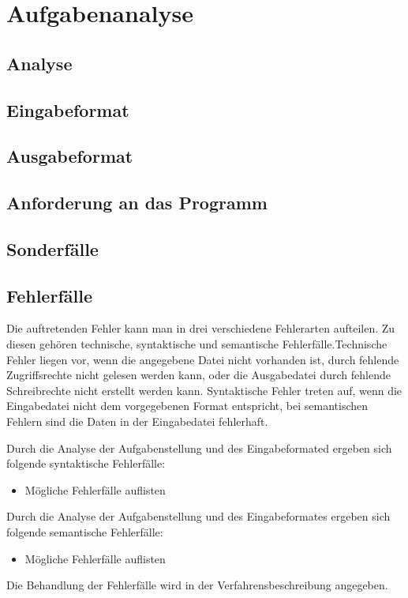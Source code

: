 \chapter{Aufgabenanalyse}
\label{chap:Aufgabenanalyse}
\section{Analyse}

\vspace{-0.3cm}
\section{Eingabeformat}

\clearpage
\vspace{-0.3cm}
\section{Ausgabeformat}

\vspace{-0.3cm}
\section{Anforderung an das Programm}

\vspace{-0.3cm}
\section{Sonderfälle}
\label{sec:Sonderfaelle}

\vspace{-0.3cm}
\section{Fehlerfälle}
\label{sec:Fehlerfaelle}
Die auftretenden Fehler kann man in drei verschiedene Fehlerarten aufteilen. Zu diesen gehören technische, syntaktische und semantische Fehlerfälle.\newline Technische Fehler liegen vor, wenn die angegebene Datei nicht vorhanden ist, durch fehlende Zugriffsrechte nicht gelesen werden kann, oder die Ausgabedatei durch fehlende Schreibrechte nicht erstellt werden kann. Syntaktische Fehler treten auf, wenn die Eingabedatei nicht dem vorgegebenen Format entspricht, bei semantischen Fehlern sind die Daten in der Eingabedatei fehlerhaft.

Durch die Analyse der Aufgabenstellung und des Eingabeformated ergeben sich folgende syntaktische Fehlerfälle:
\begin{itemize}
    \item Mögliche Fehlerfälle auflisten
\end{itemize}

Durch die Analyse der Aufgabenstellung und des Eingabeformates ergeben sich folgende semantische Fehlerfälle:
\begin{itemize}
	\item Mögliche Fehlerfälle auflisten
\end{itemize}

Die Behandlung der Fehlerfälle wird in der Verfahrensbeschreibung angegeben.
\cleardoublepage